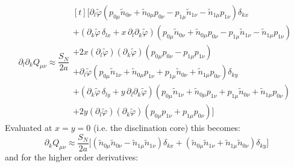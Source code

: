 \documentclass[reqno]{article}
\newcommand{\phitilde}{\tilde{\varphi}}
\begin{document}
\begin{equation}
    \partial_l \partial_k Q_{\mu \nu}
    \approx
    \frac{S_N}{2a}
    \begin{multlined}[t]
    \biggl[
        \partial_l \phitilde \left( p_{0\mu} \tilde{n}_{0\nu} + \tilde{n}_{0\mu} p_{0\nu} - p_{1\mu} \tilde{n}_{1\nu} - \tilde{n}_{1\mu} p_{1\nu} \right)\delta_{k x} \\
        + \left(\partial_k \phitilde \, \delta_{lx} + x \, \partial_l \partial_k \phitilde \right) \left( 
            p_{0\mu} \tilde{n}_{0\nu} + \tilde{n}_{0\mu} p_{0\nu} - p_{1\mu} \tilde{n}_{1\nu} - \tilde{n}_{1\mu} p_{1\nu}
        \right) \\
        + 2x \left(\partial_l \phitilde\right) \left(\partial_k \phitilde\right) \left( 
            p_{0\mu} p_{0\nu} - p_{1\mu} p_{1\nu}
        \right) \\
        + \partial_l \phitilde \left( 
            p_{0\mu} \tilde{n}_{1\nu} + \tilde{n}_{0\mu} p_{1\nu} + p_{1\mu} \tilde{n}_{0\nu} + \tilde{n}_{1\mu} p_{0\nu}
        \right) \delta_{k y} \\
        + \left( \partial_k \phitilde \, \delta_{l y} + y \, \partial_l \partial_k \phitilde \right) \left( 
            p_{0\mu} \tilde{n}_{1\nu} + \tilde{n}_{0\mu} p_{1\nu} + p_{1\mu} \tilde{n}_{0\nu} + \tilde{n}_{1\mu} p_{0\nu}
        \right) \\
        + 2y \left( \partial_l \phitilde \right) \left(\partial_k \phitilde \right) \left( 
            p_{0\mu} p_{1\nu}+ p_{1\mu} p_{0\nu}
        \right)
    \biggr]
    \end{multlined}
\end{equation}
Evaluated at $x = y = 0$ (i.e. the disclination core) this becomes:
\begin{equation}
    \partial_k Q_{\mu \nu}
    \approx
    \frac{S_N}{2a}
    \bigl[
        \left( \tilde{n}_{0\mu} \tilde{n}_{0\nu} - \tilde{n}_{1\mu} \tilde{n}_{1\nu} \right)\delta_{k x} 
        + \left( \tilde{n}_{0\mu} \tilde{n}_{1\nu} + \tilde{n}_{1\mu} \tilde{n}_{0\nu} \right) \delta_{k y}
    \bigr]
\end{equation}
and for the higher order derivatives:
\end{document}
